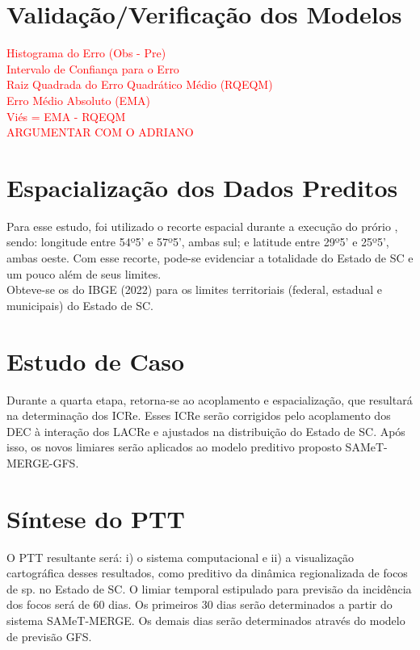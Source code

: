 \section{Validação/Verificação dos Modelos}

\indent \textcolor{red}{Histograma do Erro (Obs - Pre)\\
\indent Intervalo de Confiança para o Erro\\
\indent Raiz Quadrada do Erro Quadrático Médio (RQEQM)\\
\indent Erro Médio Absoluto (EMA)\\
\indent Viés = EMA - RQEQM}\\

\indent \textcolor{red}{ARGUMENTAR COM O ADRIANO}\\

\section{Espacialização dos Dados Preditos}

\indent Para esse estudo, foi utilizado o recorte espacial durante a execução do prório , sendo: longitude entre 54º5' e 57º5', ambas sul; e latitude entre 29º5' e 25º5', ambas oeste. Com esse recorte, pode-se evidenciar a totalidade do Estado de \acrlong{SC} e um pouco além de seus limites.\\
\indent Obteve-se os  do \acrshort{IBGE} (2022) para os limites territoriais (federal, estadual e municipais) do Estado de \acrlong{SC}.\\

\section{Estudo de Caso}

\indent Durante a quarta etapa, retorna-se ao acoplamento e espacialização, que resultará na determinação dos \acrfull{ICRe}. Esses \acrshort{ICRe} serão corrigidos pelo acoplamento dos \acrshort{DEC} à interação dos \acrshort{LACRe} e ajustados na distribuição do Estado de \acrlong{SC}. Após isso, os novos limiares serão aplicados ao modelo preditivo proposto \acrshort{SAMeT}-\acrshort{MERGE}-\acrshort{GFS}.


\section{Síntese do \acrfull{PTT}} 

\indent O \acrshort{PTT} resultante será: i) o sistema computacional e ii) a visualização cartográfica desses resultados, como preditivo da dinâmica regionalizada de focos de  sp. no Estado de \acrlong{SC}. O limiar temporal estipulado para previsão da incidência dos focos será de 60 dias. Os primeiros 30 dias serão determinados a partir do sistema \acrshort{SAMeT}-\acrshort{MERGE}. Os demais dias serão determinados através do modelo de previsão \acrshort{GFS}.


